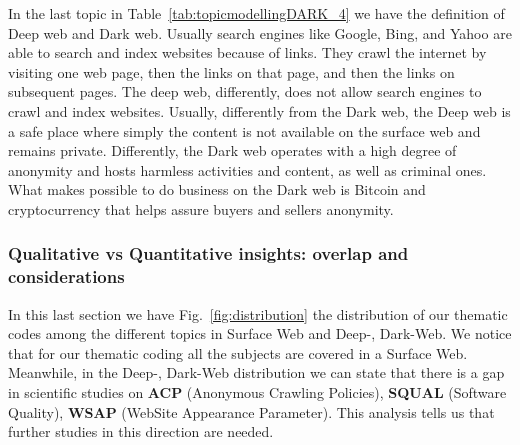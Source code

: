 In the last topic in Table~\ref{tab:topicmodellingDARK_4} we have the definition of Deep web and Dark web. Usually search engines like Google, Bing, and Yahoo are able to search and index websites because of links. They crawl the internet by visiting one web page, then the links on that page, and then the links on subsequent pages. The deep web, differently, does not allow search engines to crawl and index websites. Usually, differently from the Dark web, the Deep web is a safe place where simply the content is not available on the surface web and remains private. Differently, the Dark web operates with a high degree of anonymity and hosts harmless activities and content, as well as criminal ones. What makes possible to do business on the Dark web is Bitcoin and cryptocurrency that helps assure buyers and sellers anonymity.


\subsubsection{Qualitative vs Quantitative insights: overlap and considerations}

In this last section we have Fig.~\ref{fig:distribution} the distribution of our thematic codes among the different topics in Surface Web and Deep-, Dark-Web. We notice that for our  thematic coding all the subjects are covered in a Surface Web. Meanwhile, in the Deep-, Dark-Web distribution we can state that there is a gap in scientific studies on \textbf{ACP} (Anonymous Crawling Policies), \textbf{SQUAL} (Software Quality), \textbf{WSAP} (WebSite Appearance Parameter). This analysis tells us that further studies in this direction are needed. 





